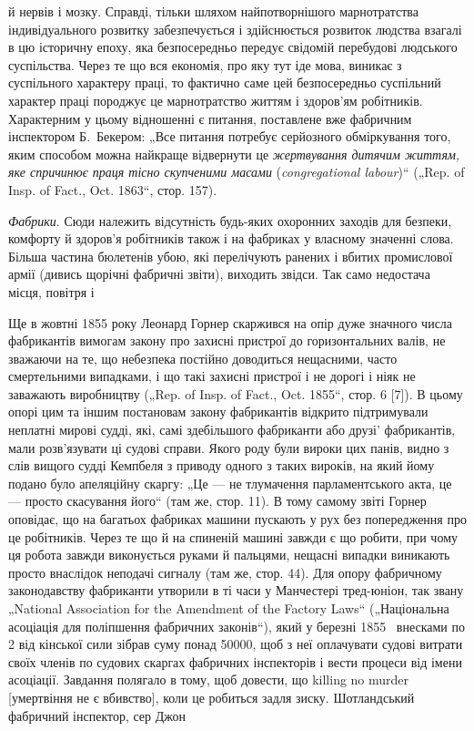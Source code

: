 \parcont{}  %
й нервів і мозку. Справді, тільки шляхом найпотворнішого марнотратства індивідуального розвитку
забезпечується і здійснюється
розвиток людства взагалі в цю історичну епоху, яка безпосередньо передує свідомій перебудові
людського суспільства. Через те що вся економія, про яку тут іде мова, виникає з суспільного
характеру праці, то фактично саме цей безпосередньо
суспільний характер праці породжує це марнотратство життям і
здоров’ям робітників. Характерним у цьому відношенні є питання,
поставлене вже фабричним інспектором Б.~Бекером: „Все питання потребує серйозного обміркування того,
яким способом
можна найкраще відвернути це \emph{жертвування дитячим життям,
яке спричинює праця тісно скупченими масами} (\emph{congregational
labour})“ („Rep. of Insp. of Fact., Oct. 1863“, стор. 157).

\emph{Фабрики}. Сюди належить відсутність будь-яких охоронних
заходів для безпеки, комфорту й здоров’я робітників також і на
фабриках у власному значенні слова. Більша частина бюлетенів
убою, які перелічують ранених і вбитих промислової армії (дивись щорічні фабричні звіти), виходить
звідси. Так само недостача місця, повітря і~

Ще в жовтні 1855 року Леонард Горнер скаржився на опір
дуже значного числа фабрикантів вимогам закону про захисні
пристрої до горизонтальних валів, не зважаючи на те, що небезпека постійно доводиться нещасними,
часто смертельними
випадками, і що такі захисні пристрої і не дорогі і ніяк не заважають виробництву („Rep. of Insp. of
Fact., Oct. 1855“, стор. 6 [7]).
В цьому опорі цим та іншим постановам закону фабрикантів
відкрито підтримували неплатні мирові судді, які, самі здебільшого фабриканти або друзі'
фабрикантів, мали розв’язувати ці судові справи. Якого роду були вироки цих панів,
видно з слів вищого судді Кемпбеля з приводу одного з таких
вироків, на який йому подано було апеляційну скаргу: „Це —
не тлумачення парламентського акта, це — просто скасування
його“ (там же, стор. 11). В тому самому звіті Горнер оповідає, що на багатьох фабриках машини
пускають у рух без
попередження про це робітників. Через те що й на спиненій
машині завжди є що робити, при чому ця робота завжди виконується руками й пальцями, нещасні випадки
виникають просто
внаслідок неподачі сигналу (там же, стор. 44). Для опору
фабричному законодавству фабриканти утворили в ті часи
у Манчестері тред-юніон, так звану „National Association for the
Amendment of the Factory Laws“ („Національна асоціація для поліпшення фабричних законів“), який у
березні 1855~ внесками
по 2 від кінської сили зібрав суму понад \num{50000}, щоб з неї оплачувати судові витрати своїх членів
по судових скаргах фабричних інспекторів і вести процеси від
імени асоціації. Завдання полягало в тому, щоб довести, що killing no murder [умертвіння не є
вбивство], коли це робиться
задля зиску. Шотландський фабричний інспектор, сер Джон
\parbreak{}  %
